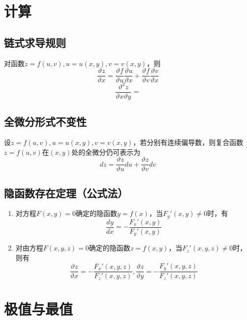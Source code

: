 \section{计算}

\subsection{链式求导规则}
对函数\(z = f(u, v), u = u(x, y), v = v(x, y)\)，则\[\dfrac{\vartheta z}{\vartheta x} = \dfrac{\vartheta f}{\vartheta u}\dfrac{\vartheta u}{\vartheta x} + \dfrac{\vartheta f}{\vartheta v}\dfrac{\vartheta v}{\vartheta x}\]
\[\dfrac{\vartheta^2z}{\vartheta x\vartheta y} = \]


\subsection{全微分形式不变性}
设\(z = f(u, v), u = u(x, y), v = v(x, y)\)，若分别有连续偏导数，则复合函数\(z = f(u, v)\)在\((x, y)\)处的全微分仍可表示为\[dz = \dfrac{\vartheta z}{\vartheta u}du + \dfrac{\vartheta z}{\vartheta v}dv\]

\subsection{隐函数存在定理（公式法）}
\begin{enumerate}
    \item 对方程\(F(x, y) = 0\)确定的隐函数\(y = f(x)\)，当\(F_y'(x, y) \neq 0\)时，有\[\dfrac{dy}{dx} = -\dfrac{F_x'(x, y)}{F_y'(x, y)}\]

    \item 对由方程\(F(x, y, z) = 0\)确定的隐函数\(z = f(x, y)\)，当\(F_z'(x, y, z) \neq 0\)时，则有\[\dfrac{\vartheta z}{\vartheta x} = -\dfrac{F_x'(x, y, z)}{F_z'(x, y, z)}, \dfrac{\vartheta z}{\vartheta y} = -\dfrac{F_y'(x, y, z)}{F_z'(x, y, z)}\]
\end{enumerate}


\section{极值与最值}

